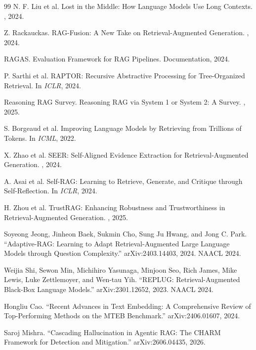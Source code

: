 \begin{thebibliography}{99}
N. F. Liu et al.
\newblock Lost in the Middle: How Language Models Use Long Contexts.
, 2024.

Z. Rackauckas.
\newblock RAG-Fusion: A New Take on Retrieval-Augmented Generation.
, 2024.

RAGAS.
\newblock Evaluation Framework for RAG Pipelines.
\newblock Documentation, 2024.

P. Sarthi et al.
\newblock RAPTOR: Recursive Abstractive Processing for Tree-Organized Retrieval.
\newblock In {\em ICLR}, 2024.

Reasoning RAG Survey.
\newblock Reasoning RAG via System 1 or System 2: A Survey.
, 2025.

S. Borgeaud et al.
\newblock Improving Language Models by Retrieving from Trillions of Tokens.
\newblock In {\em ICML}, 2022.

X. Zhao et al.
\newblock SEER: Self-Aligned Evidence Extraction for Retrieval-Augmented Generation.
, 2024.

A. Asai et al.
\newblock Self-RAG: Learning to Retrieve, Generate, and Critique through Self-Reflection.
\newblock In {\em ICLR}, 2024.

H. Zhou et al.
\newblock TrustRAG: Enhancing Robustness and Trustworthiness in Retrieval-Augmented Generation.
, 2025.

Soyeong Jeong, Jinheon Baek, Sukmin Cho, Sung Ju Hwang, and Jong C. Park.
``Adaptive-RAG: Learning to Adapt Retrieval-Augmented Large Language Models
through Question Complexity.''
arXiv:2403.14403, 2024. NAACL 2024.

Weijia Shi, Sewon Min, Michihiro Yasunaga, Minjoon Seo, Rich James,
Mike Lewis, Luke Zettlemoyer, and Wen-tau Yih.
``REPLUG: Retrieval-Augmented Black-Box Language Models.''
arXiv:2301.12652, 2023. NAACL 2024.

Hongliu Cao.
``Recent Advances in Text Embedding: A Comprehensive Review of Top-Performing
Methods on the MTEB Benchmark.''
arXiv:2406.01607, 2024.

Saroj Mishra.
``Cascading Hallucination in Agentic RAG: The CHARM Framework for Detection and Mitigation.''
arXiv:2606.04435, 2026.


\end{thebibliography}
